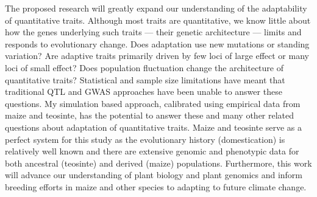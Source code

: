 
The proposed research will greatly expand our understanding of the adaptability of quantitative traits. Although most traits are  quantitative, we know little about how the genes underlying such traits --- their genetic architecture --- limits and responds to evolutionary change. Does adaptation use new mutations or standing variation? Are adaptive traits primarily driven by few loci of large effect or many loci of small effect? Does population fluctuation change the architecture of quantitative traits? Statistical and sample size limitations have meant that traditional QTL and GWAS approaches have been unable to answer these questions. My simulation based approach, calibrated using empirical data from maize and teosinte, has the potential to answer these and many other related questions about adaptation of quantitative traits.  Maize and teosinte  serve as a perfect system for this study as the evolutionary history (domestication) is relatively well known and there are extensive genomic and phenotypic data for both ancestral (teosinte) and derived (maize) populations. Furthermore, this work will advance our understanding of plant biology and plant genomics and inform breeding efforts in maize and other species to adapting to future climate change. 


\vspace{-0.4cm}

